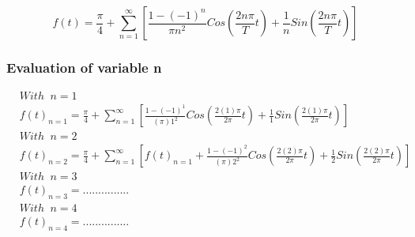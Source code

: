 \documentclass{article}
\begin{document}
\begin{equation}
    f(t)=\frac{\pi}{4}+\sum_{n=1}^{\infty} \left [\frac{1-(-1)^n}{\pi n^2} Cos \left ( \frac{2 n \pi}{T}t\right )  + \frac{1}{n} Sin \left ( \frac{2 n \pi}{T}t\right ) \right ]
\end{equation}

\subsubsection{Evaluation of variable n}

\begin{align*}
    &With\phantom{a}n = 1\\
     &f(t)_{n=1}=\frac{\pi}{4}+\sum_{n=1}^{\infty} \left [\frac{1-(-1)^1}{(\pi) 1^2} Cos \left ( \frac{2 (1) \pi}{2 \pi}t\right )  + \frac{1}{1} Sin \left ( \frac{2 (1) \pi}{2 \pi}t\right ) \right ]\\
     &With\phantom{a}n = 2\\
     &f(t)_{n=2}=\frac{\pi}{4}+\sum_{n=1}^{\infty} \left [  f(t)_{n=1} +\frac{1-(-1)^2}{(\pi) 2^2} Cos \left ( \frac{2 (2) \pi}{2 \pi}t\right )  + \frac{1}{2} Sin \left ( \frac{2 (2) \pi}{2 \pi}t\right ) \right ]\\
     &With\phantom{a}n = 3\\
     &f(t)_{n=3}=...............\\
     &With\phantom{a}n = 4\\
     &f(t)_{n=4}=...............
\end{align*}
\end{document}
